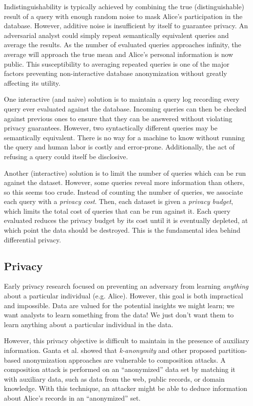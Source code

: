 \documentclass[12pt]{report}
\begin{document}
Indistinguishability is typically achieved by combining the true (distinguishable) result of a query with enough random noise to mask Alice's participation in the database.
However, additive noise is insufficient by itself to guarantee privacy.
An adversarial analyst could simply repeat semantically equivalent queries and average the results.
As the number of evaluated queries approaches infinity, the average will approach the true mean and Alice's personal information is now public.
This susceptibility to averaging repeated queries is one of the major factors preventing non-interactive database anonymization without greatly affecting its utility.

One interactive (and naive) solution is to maintain a query log recording every query ever evaluated against the database.
Incoming queries can then be checked against previous ones to ensure that they can be answered without violating privacy guarantees.
However, two syntactically different queries may be semantically equivalent.
There is no way for a machine to know without running the query and human labor is costly and error-prone.
Additionally, the act of refusing a query could itself be disclosive.

Another (interactive) solution is to limit the number of queries which can be run against the dataset.
However, some queries reveal more information than others, so this seems too crude.
Instead of counting the number of queries, we associate each query with a \textit{privacy cost}.
Then, each dataset is given a \textit{privacy budget}, which limits the total cost of queries that can be run against it.
Each query evaluated reduces the privacy budget by its cost until it is eventually depleted, at which point the data should be destroyed.
This is the fundamental idea behind differential privacy.

\subsection{Privacy}\label{subsec:intro-almostperfectpriv}

Early privacy research focused on preventing an adversary from learning \textit{anything} about a particular individual (e.g. Alice).
However, this goal is both impractical and impossible.
Data are valued for the potential insights we might learn;
we want analysts to learn something from the data!
We just don't want them to learn anything about a particular individual in the data.

However, this privacy objective is difficult to maintain in the presence of auxiliary information.
Ganta et al. showed that \textit{k-anonymity} and other proposed partition-based anonymization approaches are vulnerable to composition attacks\cite{ganta2008composition}.
A composition attack is performed on an ``anonymized'' data set by matching it with auxiliary data, such as data from the web, public records, or domain knowledge.
With this technique, an attacker might be able to deduce information about Alice's records in an ``anonymized'' set.
\end{document}
